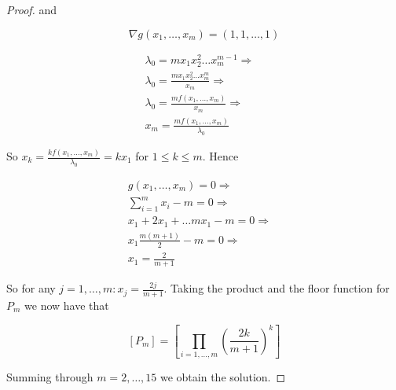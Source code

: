 \documentclass[12pt]{article}
\begin{document}
\begin{proof}
and 

\begin{equation*}
\nabla g(x_1,\ldots,x_m) = \left(1,1,\ldots,1 \right)
\end{equation*}


\begin{align*}
\lambda_0 = mx_1x_2^2\ldots x_m^{m-1} \Rightarrow &\\
\lambda_0 = \frac{mx_1x_2^2\ldots x_m^{m}}{x_m} \Rightarrow &\\
\lambda_0 = \frac{mf(x_1,\ldots,x_m)}{x_m} \Rightarrow &\\
x_m = \frac{mf(x_1,\ldots,x_m)}{\lambda_0}
\end{align*}

So $\displaystyle x_k = \frac{kf(x_1,\ldots,x_m)}{\lambda_0} = kx_1$ for $1 \leq k \leq m$. Hence 

\begin{align*}
g(x_1,\ldots,x_m) = 0 \Rightarrow &\\
\sum_{i=1}^{m} x_i -m = 0 \Rightarrow &\\
x_1 + 2x_1 + \ldots mx_1 - m = 0 \Rightarrow &\\
x_1 \frac{m(m+1)}{2} - m = 0 \Rightarrow  &\\
x_1 = \frac{2}{m+1}
\end{align*}

So for any $\displaystyle j=1,\ldots,m: x_j = \frac{2j}{m+1}$. Taking the product and the floor function for $P_m$ we now have that

$$\left[ P_m \right] = \left[ \prod_{i=1,\ldots,m} \left( \frac{2k}{m+1}\right)^k \right]$$
 
Summing through $m=2,\ldots,15$ we obtain the solution.

\end{proof}
\end{document}
